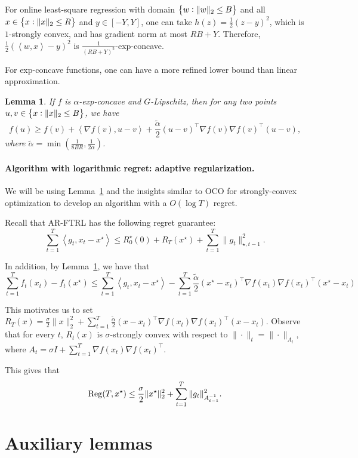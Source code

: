 \documentclass{article}
\newtheorem{lemma}{Lemma}
\DeclareMathOperator*{\Reg}{{\rm Reg}}
\newcommand{\inner}[2]{\left\langle #1,#2 \right\rangle}
\begin{document}
For online least-square regression with domain $\cbr{w: \| w\|_2 \leq B}$ and all $x \in \cbr{x: \| x \|_2 \leq R}$ and $y \in [-Y, Y]$,
one can take $h(z) = \frac12(z - y)^2$, which is $1$-strongly convex, and has gradient norm at most $RB+Y$. Therefore, $\frac12(\inner{w}{x}-y)^2$ is $\frac{1}{(RB+Y)^2}$-exp-concave.

For exp-concave functions, one can have a more refined lower bound than linear approximation.
\begin{lemma}
If $f$ is $\alpha$-exp-concave and $G$-Lipschitz,
then for any two points $u, v \in \cbr{x: \| x \|_2 \leq B}$, we have
\[ f(u) \geq f(v) + \inner{\nabla f(v)}{u - v} + \frac{\tilde{\alpha}}{2}(u - v)^\top \nabla f(v) \nabla f(v)^\top (u - v), \]
where $\tilde{\alpha} = \min(\frac{1}{8BR}, \frac{1}{2\alpha})$.
\label{lem:quad-approx}
\end{lemma}

\paragraph{Algorithm with logarithmic regret: adaptive regularization.} We will be using Lemma~\ref{lem:quad-approx} and the insights similar to OCO for strongly-convex optimization to develop an algorithm with a $O(\log T)$ regret.

Recall that AR-FTRL has the following regret guarantee:
\[ \sum_{t=1}^T \inner{g_t}{x_t - x^\star} \leq R_0^\star(0) + R_T(x^\star) + \sum_{t=1}^T \| g_t \|_{\star, t-1}^2. \]

In addition, by Lemma~\ref{lem:quad-approx}, we have that
\[ \sum_{t=1}^T f_t(x_t) - f_t(x^\star) \leq \sum_{t=1}^T \inner{g_t}{x_t - x^\star} -  \sum_{t=1}^T \frac{\tilde{\alpha}}{2}(x^\star - x_t)^\top \nabla f(x_t) \nabla f(x_t)^\top (x^\star - x_t) \]

This motivates us to set $R_T(x) = \frac\sigma2 \|x\|_2^2 + \sum_{t=1}^T \frac{\tilde{\alpha}}{2}(x - x_t)^\top \nabla f(x_t) \nabla f(x_t)^\top (x - x_t)$. Observe that for every $t$, $R_t(x)$ is $\sigma$-strongly convex with respect to $\| \cdot \|_t = \| \cdot \|_{A_t}$, where $A_t = \sigma I + \sum_{t=1}^T \nabla f(x_t) \nabla f(x_t)^\top$.

This gives that
\[ \Reg(T, x^\star) \leq \frac\sigma2 \|x^\star\|_2^2 + \sum_{t=1}^T \| g_t \|_{A_{t-1}^{-1}}^2. \]




\appendix

\section{Auxiliary lemmas}
\end{document}
